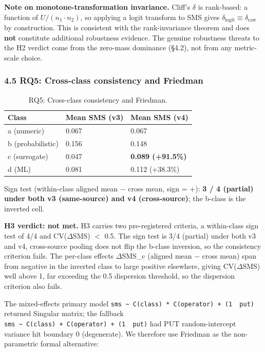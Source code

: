 \documentclass[review,12pt,authoryear]{elsarticle}
\begin{document}
\textbf{Note on monotone-transformation invariance.} Cliff's $\delta$ is
rank-based: a function of $U / (n_1 \cdot n_2)$, so applying a logit transform to
SMS gives $\delta_{\mathrm{logit}} \equiv \delta_{\mathrm{raw}}$ by construction. This is consistent with the
rank-invariance theorem and does \textbf{not} constitute additional
robustness evidence. The genuine robustness threats to the H2 verdict
come from the zero-mass dominance (§4.2), not from any metric-scale
choice.

\subsubsection{4.5 RQ5: Cross-class consistency and Friedman}\label{rq3-cross-class-consistency-and-friedman}

{\def\LTcaptype{table} %
\begin{longtable}[]{@{}lll@{}}
\caption{RQ5: Cross-class consistency and Friedman.}\label{tab:p2-12}\\
\toprule\noalign{}
Class & Mean SMS (v3) & Mean SMS (v4) \\
\midrule\noalign{}
\endfirsthead
\endhead
\bottomrule\noalign{}
\endlastfoot
a (numeric) & 0.067 & 0.067 \\
b (probabilistic) & 0.156 & 0.148 \\
c (surrogate) & 0.047 & \textbf{0.089 (+91.5\%)} \\
d (ML) & 0.081 & 0.112 (+38.3\%) \\
\end{longtable}
}

Sign test (within-class aligned mean − cross mean, sign = +): \textbf{3
/ 4 (partial) under both v3 (same-source) and v4 (cross-source)}; the
b-class is the inverted cell.

\textbf{H3 verdict: not met.} H3 carries two pre-registered criteria, a
within-class sign test of 4/4 and CV($\Delta$SMS) $<$ 0.5. The sign test
is 3/4 (partial) under both v3 and v4, cross-source pooling does not
flip the b-class inversion, so the consistency criterion fails. The
per-class effects $\Delta$SMS\_c (aligned mean $-$ cross mean) span from
negative in the inverted class to large positive elsewhere, giving
CV($\Delta$SMS) well above 1, far exceeding the 0.5 dispersion threshold,
so the dispersion criterion also fails.

The mixed-effects primary model
\texttt{sms\ \textasciitilde{}\ C(class)\ *\ C(operator)\ +\ (1\ \textbar{}\ put)}
returned Singular matrix; the fallback
\texttt{sms\ \textasciitilde{}\ C(class)\ +\ C(operator)\ +\ (1\ \textbar{}\ put)}
had PUT random-intercept variance hit boundary 0 (degenerate). We
therefore use Friedman as the non-parametric formal alternative:
\end{document}
